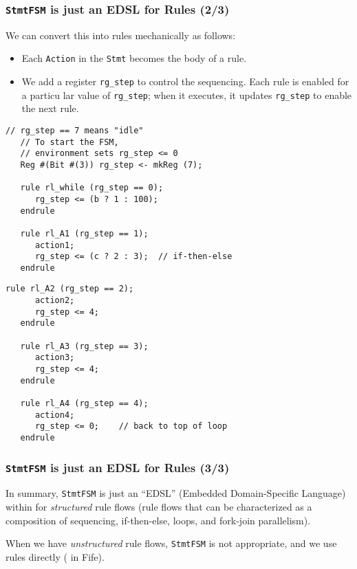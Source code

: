 
\begin{frame}[fragile]
\frametitle{{\tt StmtFSM} is just an EDSL for Rules (2/3)}

\footnotesize

We can convert this into rules mechanically as follows:
\begin{itemize}
\item Each {\tt Action} in the {\tt Stmt} becomes the body of a rule.

\item We add a register {\tt rg\_step} to control the sequencing.  Each rule
      is enabled for a particu lar value of {\tt rg\_step}; when it
      executes, it updates {\tt rg\_step} to enable the next rule.

\end{itemize}

\begin{minipage}[t]{0.47\textwidth}
\begin{Verbatim}[frame=single]
   // rg_step == 7 means "idle"
   // To start the FSM,
   // environment sets rg_step <= 0
   Reg #(Bit #(3)) rg_step <- mkReg (7);

   rule rl_while (rg_step == 0);
      rg_step <= (b ? 1 : 100);
   endrule

   rule rl_A1 (rg_step == 1);
      action1;
      rg_step <= (c ? 2 : 3);  // if-then-else
   endrule
\end{Verbatim}
\end{minipage}
\begin{minipage}[t]{0.47\textwidth}
\begin{Verbatim}[frame=single]
   rule rl_A2 (rg_step == 2);
      action2;
      rg_step <= 4;
   endrule

   rule rl_A3 (rg_step == 3);
      action3;
      rg_step <= 4;
   endrule

   rule rl_A4 (rg_step == 4);
      action4;
      rg_step <= 0;    // back to top of loop
   endrule
\end{Verbatim}
\end{minipage}

\end{frame}


\begin{frame}[fragile]
\frametitle{{\tt StmtFSM} is just an EDSL for Rules (3/3)}

\footnotesize

In summary, {\tt StmtFSM} is just an ``EDSL'' (Embedded
Domain-Specific Language) within {\BSV} for \emph{structured} rule
flows (rule flows that can be characterized as a composition of
sequencing, if-then-else, loops, and fork-join parallelism).

\vspace{5ex}

When we have \emph{unstructured} rule flows, {\tt StmtFSM} is not
appropriate, and we use rules directly ({\eg} in Fife).

\end{frame}






